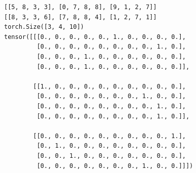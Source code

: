 \documentclass[a4paper]{article}
\begin{document}
\begin{verbatim}
[[5, 8, 3, 3], [0, 7, 8, 8], [9, 1, 2, 7]]
[[8, 3, 3, 6], [7, 8, 8, 4], [1, 2, 7, 1]]
torch.Size([3, 4, 10])
tensor([[[0., 0., 0., 0., 0., 1., 0., 0., 0., 0.],
         [0., 0., 0., 0., 0., 0., 0., 0., 1., 0.],
         [0., 0., 0., 1., 0., 0., 0., 0., 0., 0.],
         [0., 0., 0., 1., 0., 0., 0., 0., 0., 0.]],

        [[1., 0., 0., 0., 0., 0., 0., 0., 0., 0.],
         [0., 0., 0., 0., 0., 0., 0., 1., 0., 0.],
         [0., 0., 0., 0., 0., 0., 0., 0., 1., 0.],
         [0., 0., 0., 0., 0., 0., 0., 0., 1., 0.]],

        [[0., 0., 0., 0., 0., 0., 0., 0., 0., 1.],
         [0., 1., 0., 0., 0., 0., 0., 0., 0., 0.],
         [0., 0., 1., 0., 0., 0., 0., 0., 0., 0.],
         [0., 0., 0., 0., 0., 0., 0., 1., 0., 0.]]])
\end{verbatim}
\end{document}
